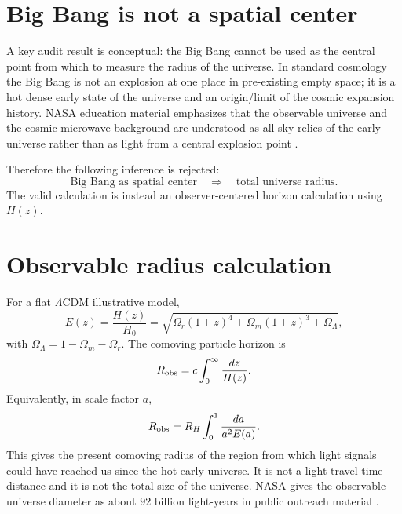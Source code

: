 \documentclass[11pt,a4paper]{article}
\begin{document}
\section{Big Bang is not a spatial center}
A key audit result is conceptual: the Big Bang cannot be used as the central point from which to measure the radius of the universe. In standard cosmology the Big Bang is not an explosion at one place in pre-existing empty space; it is a hot dense early state of the universe and an origin/limit of the cosmic expansion history. NASA education material emphasizes that the observable universe and the cosmic microwave background are understood as all-sky relics of the early universe rather than as light from a central explosion point \cite{nasa_gsfc_bigbang,nasa_wmap_overview}.

Therefore the following inference is rejected:
\begin{equation}
    \text{Big Bang as spatial center} \quad\Rightarrow\quad \text{total universe radius}.
\end{equation}
The valid calculation is instead an observer-centered horizon calculation using $H(z)$.

\section{Observable radius calculation}
For a flat $\Lambda$CDM illustrative model,
\begin{equation}
    E(z)=\frac{H(z)}{H_0}=\sqrt{\Omega_r(1+z)^4+\Omega_m(1+z)^3+\Omega_\Lambda},
\end{equation}
with $\Omega_\Lambda=1-\Omega_m-\Omega_r$. The comoving particle horizon is
\begin{equation}
    R_{\rm obs}=c\int_0^\infty \frac{dz}{H(z)}.
\end{equation}
Equivalently, in scale factor $a$,
\begin{equation}
    R_{\rm obs}=R_H\int_0^1 \frac{da}{a^2E(a)}.
\end{equation}
This gives the present comoving radius of the region from which light signals could have reached us since the hot early universe. It is not a light-travel-time distance and it is not the total size of the universe. NASA gives the observable-universe diameter as about $92$ billion light-years in public outreach material \cite{nasa_how_big_space}.
\end{document}

